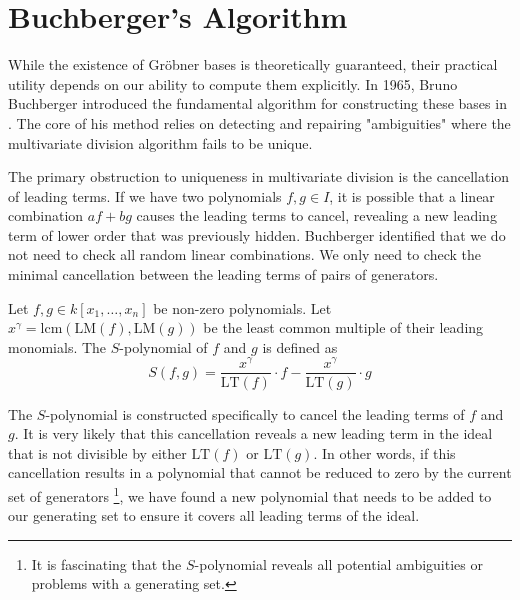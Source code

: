 \section{Buchberger's Algorithm}

While the existence of Gröbner bases is theoretically guaranteed, their practical utility depends on our ability to compute them explicitly. In 1965, Bruno Buchberger introduced the fundamental algorithm for constructing these bases in \cite{Buchberger1965_algorithmGerman,Buchberger1965_algorithmEnglish}. The core of his method relies on detecting and repairing "ambiguities" where the multivariate division algorithm fails to be unique.

The primary obstruction to uniqueness in multivariate division is the cancellation of leading terms. If we have two polynomials $f, g \in I$, it is possible that a linear combination $af + bg$ causes the leading terms to cancel, revealing a new leading term of lower order that was previously hidden. Buchberger identified that we do not need to check all random linear combinations. We only need to check the minimal cancellation between the leading terms of pairs of generators.

\begin{definition}[$S$-polynomial]
\label{def:s_polynomial}
Let $f, g \in k[x_1, \dots, x_n]$ be non-zero polynomials. Let $x^\gamma = \text{lcm}(\text{LM}(f), \text{LM}(g))$ be the least common multiple of their leading monomials. The $S$-polynomial of $f$ and $g$ is defined as
$$
S(f, g) = \frac{x^\gamma}{\text{LT}(f)} \cdot f - \frac{x^\gamma}{\text{LT}(g)} \cdot g
$$
\end{definition}

The $S$-polynomial is constructed specifically to cancel the leading terms of $f$ and $g$. It is very likely that this cancellation reveals a new leading term in the ideal that is not divisible by either $\text{LT}(f)$ or $\text{LT}(g)$. In other words, if this cancellation results in a polynomial that cannot be reduced to zero by the current set of generators \footnote{It is fascinating that the $S$-polynomial reveals all potential ambiguities or problems with a generating set.}, we have found a new polynomial that needs to be added to our generating set to ensure it covers all leading terms of the ideal.

